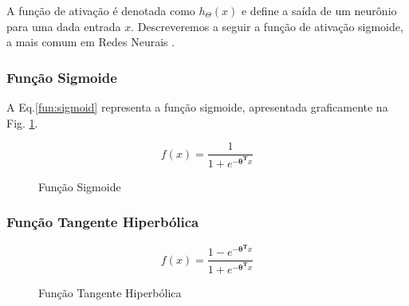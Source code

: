 
A função de ativação é denotada como $h_\Theta (x)$ e define a saída de um neurônio para uma dada entrada $x$. Descreveremos a seguir a função de ativação sigmoide, a mais comum em Redes Neurais \cite{haykin2004comprehensive, haykin2009neural, lecun2015deep}.

\subsubsection{Função Sigmoide}
\label{subsec:sigmoid}

A Eq.\ref{fun:sigmoid} representa a função sigmoide, apresentada graficamente na Fig. \ref{fg:funcao_sigmoide}. 


\begin{equation}
  f(x) =  \frac{\mathrm{1} }{\mathrm{1} + e^{- \mathbf{\theta^T}x}}
  \label{fun:sigmoid}
\end{equation}

\begin{center}
    \begin{figure}
     \caption{Função Sigmoide}
        \centering
   \label{fg:funcao_sigmoide}
	\end{figure}
\end{center}

\subsubsection{Função Tangente Hiperbólica}
\label{subsec:htan}

\begin{equation}
  f(x) =  \frac{\mathrm{1} - e^{- \mathbf{\theta^T}x}}{\mathrm{1} + e^{- \mathbf{\theta^T}x}}
  \label{fun:tanh}
\end{equation}

\begin{center}
    \begin{figure}
    \caption{Função Tangente Hiperbólica}
        \centering
    \label{fg:funcao_tanh}
	\end{figure}
\end{center}



